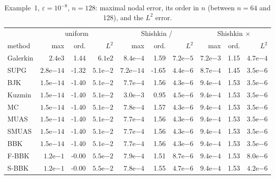 \begin{table}[!htbp]
\centering\scriptsize\setlength{\tabcolsep}{3pt}
\caption{Example~1, $\varepsilon=10^{-8}$, $n=128$: maximal nodal error, its order in $n$ (between $n=64$ and 128), and the $L^2$ error.}\label{tab:acc-exp_layer-1e-08}
\begin{tabular}{l rrr rrr rrr}
\toprule
 & \multicolumn{3}{c}{uniform} & \multicolumn{3}{c}{Shishkin /} & \multicolumn{3}{c}{Shishkin $\times$}\\
method & max & ord. & $L^2$ & max & ord. & $L^2$ & max & ord. & $L^2$\\
\midrule
Galerkin & $2.4\mathrm{e}{3}$ & 1.44 & $6.1\mathrm{e}{2}$ & $8.4\mathrm{e}{-4}$ & 1.59 & $7.2\mathrm{e}{-5}$ & $7.2\mathrm{e}{-3}$ & 1.15 & $4.7\mathrm{e}{-4}$ \\
SUPG & $2.8\mathrm{e}{-14}$ & -1.32 & $5.1\mathrm{e}{-2}$ & $7.2\mathrm{e}{-14}$ & -1.65 & $4.4\mathrm{e}{-6}$ & $8.7\mathrm{e}{-4}$ & 1.45 & $3.5\mathrm{e}{-6}$ \\
BJK & $1.5\mathrm{e}{-14}$ & -1.40 & $5.1\mathrm{e}{-2}$ & $7.7\mathrm{e}{-4}$ & 1.56 & $4.3\mathrm{e}{-6}$ & $9.4\mathrm{e}{-4}$ & 1.53 & $3.5\mathrm{e}{-6}$ \\
Kuzmin & $1.5\mathrm{e}{-14}$ & -1.40 & $5.1\mathrm{e}{-2}$ & $3.0\mathrm{e}{-3}$ & 0.95 & $4.5\mathrm{e}{-6}$ & $9.4\mathrm{e}{-4}$ & 1.53 & $3.5\mathrm{e}{-6}$ \\
MC & $1.5\mathrm{e}{-14}$ & -1.40 & $5.1\mathrm{e}{-2}$ & $7.8\mathrm{e}{-4}$ & 1.57 & $4.3\mathrm{e}{-6}$ & $9.4\mathrm{e}{-4}$ & 1.53 & $3.5\mathrm{e}{-6}$ \\
MUAS & $1.5\mathrm{e}{-14}$ & -1.40 & $5.1\mathrm{e}{-2}$ & $7.7\mathrm{e}{-4}$ & 1.56 & $4.3\mathrm{e}{-6}$ & $9.4\mathrm{e}{-4}$ & 1.53 & $3.5\mathrm{e}{-6}$ \\
SMUAS & $1.5\mathrm{e}{-14}$ & -1.40 & $5.1\mathrm{e}{-2}$ & $7.7\mathrm{e}{-4}$ & 1.56 & $4.3\mathrm{e}{-6}$ & $9.4\mathrm{e}{-4}$ & 1.53 & $3.5\mathrm{e}{-6}$ \\
BBK & $1.5\mathrm{e}{-14}$ & -1.40 & $5.1\mathrm{e}{-2}$ & $7.7\mathrm{e}{-4}$ & 1.56 & $4.3\mathrm{e}{-6}$ & $9.4\mathrm{e}{-4}$ & 1.53 & $3.5\mathrm{e}{-6}$ \\
F-BBK & $1.2\mathrm{e}{-1}$ & -0.00 & $5.5\mathrm{e}{-2}$ & $7.9\mathrm{e}{-4}$ & 1.51 & $8.7\mathrm{e}{-6}$ & $9.4\mathrm{e}{-4}$ & 1.53 & $8.0\mathrm{e}{-6}$ \\
S-BBK & $1.2\mathrm{e}{-1}$ & -0.00 & $5.5\mathrm{e}{-2}$ & $7.8\mathrm{e}{-4}$ & 1.55 & $4.7\mathrm{e}{-6}$ & $9.4\mathrm{e}{-4}$ & 1.53 & $4.2\mathrm{e}{-6}$ \\
\bottomrule
\end{tabular}
\end{table}


